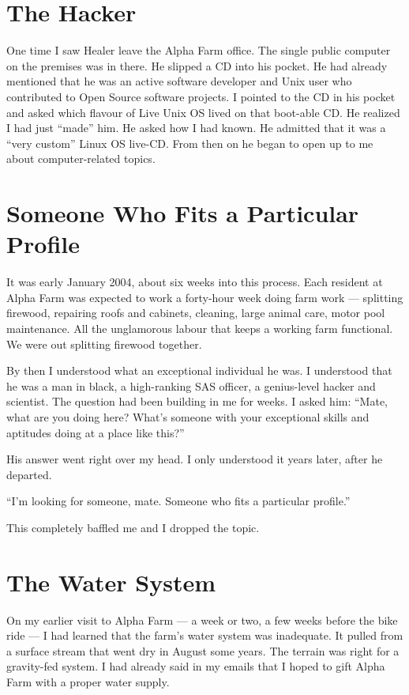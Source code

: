 \section*{The Hacker}
\label{pos02:the-hacker}

One time I saw Healer leave the Alpha Farm office. The single public computer on the premises was in there. He slipped a CD into his pocket. He had already mentioned that he was an active software developer and Unix user who contributed to Open Source software projects. I pointed to the CD in his pocket and asked which flavour of Live Unix OS lived on that boot-able CD. He realized I had just ``made'' him. He asked how I had known. He admitted that it was a ``very custom'' Linux OS live-CD. From then on he began to open up to me about computer-related topics.

\section*{Someone Who Fits a Particular Profile}
\label{pos02:someone-who-fits-a-particular-profile}

It was early January 2004, about six weeks into this process. Each resident at Alpha Farm was expected to work a forty-hour week doing farm work --- splitting firewood, repairing roofs and cabinets, cleaning, large animal care, motor pool maintenance. All the unglamorous labour that keeps a working farm functional. We were out splitting firewood together.

By then I understood what an exceptional individual he was. I understood that he was a man in black, a high-ranking SAS officer, a genius-level hacker and scientist. The question had been building in me for weeks. I asked him: ``Mate, what are you doing here? What's someone with your exceptional skills and aptitudes doing at a place like this?''

His answer went right over my head. I only understood it years later, after he departed.

``I'm looking for someone, mate. Someone who fits a particular profile.''

This completely baffled me and I dropped the topic.

\section*{The Water System}
\label{pos02:the-water-system}

On my earlier visit to Alpha Farm --- a week or two, a few weeks before the bike ride --- I had learned that the farm's water system was inadequate. It pulled from a surface stream that went dry in August some years. The terrain was right for a gravity-fed system. I had already said in my emails that I hoped to gift Alpha Farm with a proper water supply.

